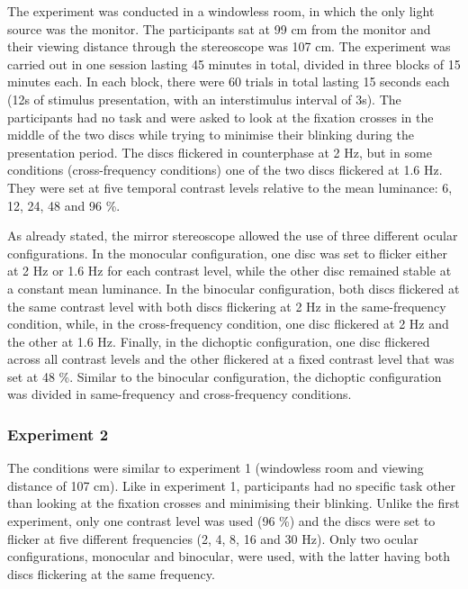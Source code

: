 \documentclass[
]{article}
\begin{document}
The experiment was conducted in a windowless room, in which the only light source was the monitor. The participants sat at 99 cm from the monitor and their viewing distance through the stereoscope was 107 cm. The experiment was carried out in one session lasting 45 minutes in total, divided in three blocks of 15 minutes each. In each block, there were 60 trials in total lasting 15 seconds each (12s of stimulus presentation, with an interstimulus interval of 3s). The participants had no task and were asked to look at the fixation crosses in the middle of the two discs while trying to minimise their blinking during the presentation period. The discs flickered in counterphase at 2 Hz, but in some conditions (cross-frequency conditions) one of the two discs flickered at 1.6 Hz. They were set at five temporal contrast levels relative to the mean luminance: 6, 12, 24, 48 and 96 \%.

As already stated, the mirror stereoscope allowed the use of three different ocular configurations. In the monocular configuration, one disc was set to flicker either at 2 Hz or 1.6 Hz for each contrast level, while the other disc remained stable at a constant mean luminance. In the binocular configuration, both discs flickered at the same contrast level with both discs flickering at 2 Hz in the same-frequency condition, while, in the cross-frequency condition, one disc flickered at 2 Hz and the other at 1.6 Hz. Finally, in the dichoptic configuration, one disc flickered across all contrast levels and the other flickered at a fixed contrast level that was set at 48 \%. Similar to the binocular configuration, the dichoptic configuration was divided in same-frequency and cross-frequency conditions.

\hypertarget{experiment-2}{%
\subsubsection{Experiment 2}\label{experiment-2}}

The conditions were similar to experiment 1 (windowless room and viewing distance of 107 cm). Like in experiment 1, participants had no specific task other than looking at the fixation crosses and minimising their blinking. Unlike the first experiment, only one contrast level was used (96 \%) and the discs were set to flicker at five different frequencies (2, 4, 8, 16 and 30 Hz). Only two ocular configurations, monocular and binocular, were used, with the latter having both discs flickering at the same frequency.
\end{document}

